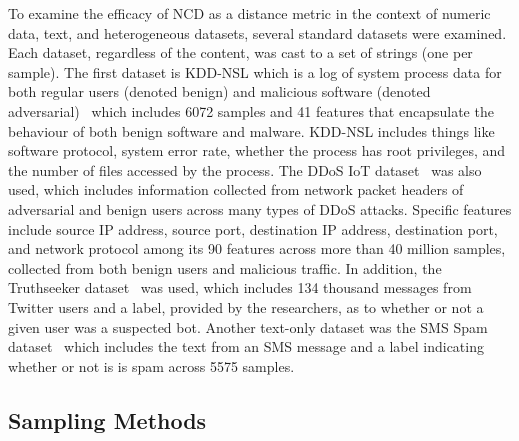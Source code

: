 \documentclass[preprint,12pt]{elsarticle}
\begin{document}
To examine the efficacy of NCD as a distance metric in the context of numeric data, text, and heterogeneous datasets, several standard datasets were examined.
Each dataset, regardless of the content, was cast to a set of strings (one per sample).
The first dataset is KDD-NSL which is a log of system process data for both regular users (denoted benign) and malicious software (denoted adversarial)~\cite{kddnsl} which includes 6072 samples and 41 features that encapsulate the behaviour of both benign software and malware.
KDD-NSL includes things like software protocol, system error rate, whether the process has root privileges, and the number of files accessed by the process.
The DDoS IoT dataset~\cite{ddos} was also used, which includes information collected from network packet headers of adversarial and benign users across many types of DDoS attacks.
Specific features include source IP address, source port, destination IP address, destination port, and network protocol among its 90 features across more than 40 million samples, collected from both benign users and malicious traffic. 
In addition, the Truthseeker dataset~\cite{truthseeker} was used, which includes 134 thousand messages from Twitter users and a label, provided by the researchers, as to whether or not a given user was a suspected bot.
Another text-only dataset was the SMS Spam dataset~\cite{sms_spam} which includes the text from an SMS message and a label indicating whether or not is is spam across 5575 samples.



\subsection{Sampling Methods}
\end{document}

